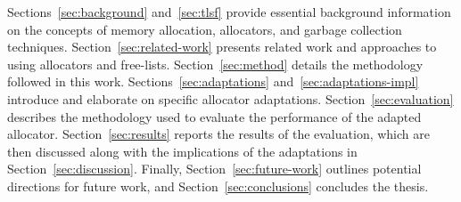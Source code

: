 
Sections~\ref{sec:background} and~\ref{sec:tlsf} provide essential background information on the concepts of memory allocation, allocators, and garbage collection techniques. Section~\ref{sec:related-work} presents related work and approaches to using allocators and free-lists. Section~\ref{sec:method} details the methodology followed in this work. Sections~\ref{sec:adaptations} and~\ref{sec:adaptations-impl} introduce and elaborate on specific allocator adaptations. Section~\ref{sec:evaluation} describes the methodology used to evaluate the performance of the adapted allocator. Section~\ref{sec:results} reports the results of the evaluation, which are then discussed along with the implications of the adaptations in Section~\ref{sec:discussion}. Finally, Section~\ref{sec:future-work} outlines potential directions for future work, and Section~\ref{sec:conclusions} concludes the thesis.

